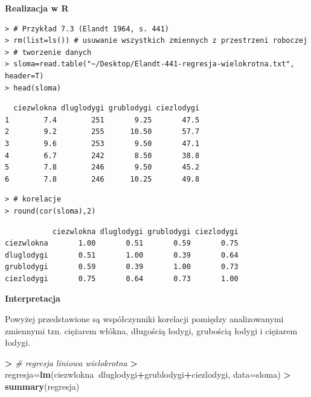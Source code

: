 \documentclass[12pt,B5paper,]{book}
\newenvironment{Shaded}{\begin{snugshade}}{\end{snugshade}}
\newcommand{\KeywordTok}[1]{\textcolor[rgb]{0.13,0.29,0.53}{\textbf{#1}}}
\newcommand{\DataTypeTok}[1]{\textcolor[rgb]{0.13,0.29,0.53}{#1}}
\newcommand{\StringTok}[1]{\textcolor[rgb]{0.31,0.60,0.02}{#1}}
\newcommand{\CommentTok}[1]{\textcolor[rgb]{0.56,0.35,0.01}{\textit{#1}}}
\newcommand{\OperatorTok}[1]{\textcolor[rgb]{0.81,0.36,0.00}{\textbf{#1}}}
\newcommand{\ErrorTok}[1]{\textcolor[rgb]{0.64,0.00,0.00}{\textbf{#1}}}
\newcommand{\NormalTok}[1]{#1}
\begin{document}
\vspace{0.8cm} \textbf{Realizacja w R}

\begin{verbatim}
> # Przykład 7.3 (Elandt 1964, s. 441)
> rm(list=ls()) # usuwanie wszystkich zmiennych z przestrzeni roboczej
> # tworzenie danych
> sloma=read.table("~/Desktop/Elandt-441-regresja-wielokrotna.txt", header=T)
> head(sloma)
\end{verbatim}

\begin{verbatim}
  ciezwlokna dluglodygi grublodygi ciezlodygi
1        7.4        251       9.25       47.5
2        9.2        255      10.50       57.7
3        9.6        253       9.50       47.1
4        6.7        242       8.50       38.8
5        7.8        246       9.50       45.2
6        7.8        246      10.25       49.8
\end{verbatim}

\begin{verbatim}
> # korelacje
> round(cor(sloma),2)
\end{verbatim}

\begin{verbatim}
           ciezwlokna dluglodygi grublodygi ciezlodygi
ciezwlokna       1.00       0.51       0.59       0.75
dluglodygi       0.51       1.00       0.39       0.64
grublodygi       0.59       0.39       1.00       0.73
ciezlodygi       0.75       0.64       0.73       1.00
\end{verbatim}

\vspace{0.8cm}

\textbf{Interpretacja}

Powyżej przedstawione są współczynniki korelacji pomiędzy analizowanymi
zmiennymi tzn. ciężarem włókna, długością łodygi, grubością łodygi i
ciężarem łodygi.

\vspace{0.8cm}

\begin{Shaded}
\begin{Highlighting}[]
\OperatorTok{>}\StringTok{ }\CommentTok{# regresja liniowa wielokrotna}
\ErrorTok{>}\StringTok{ }\NormalTok{regresja=}\KeywordTok{lm}\NormalTok{(ciezwlokna}\OperatorTok{~}\NormalTok{dluglodygi}\OperatorTok{+}\NormalTok{grublodygi}\OperatorTok{+}\NormalTok{ciezlodygi, }\DataTypeTok{data=}\NormalTok{sloma)}
\OperatorTok{>}\StringTok{ }\KeywordTok{summary}\NormalTok{(regresja)}
\end{Highlighting}
\end{Shaded}
\end{document}

